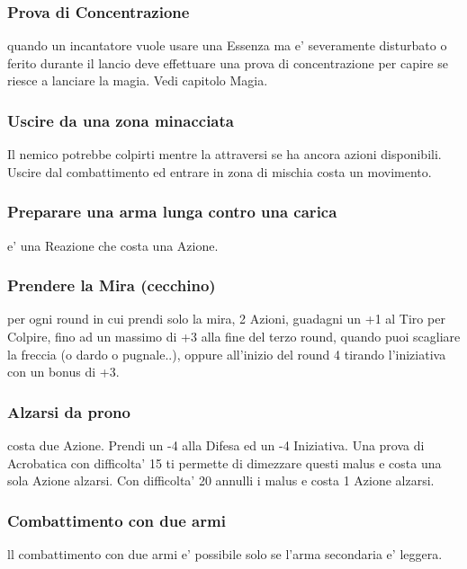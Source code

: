\documentclass[a4paper,11pt,twoside,openany]{dndbook}
\begin{document}
\subsubsection{Prova di Concentrazione} quando un incantatore vuole usare una Essenza ma e' severamente disturbato o ferito durante il lancio deve effettuare una prova di concentrazione per capire se riesce a lanciare la magia. Vedi capitolo Magia.

\subsubsection{Uscire da una zona minacciata} Il nemico potrebbe colpirti mentre la attraversi se ha ancora azioni disponibili. Uscire dal combattimento ed entrare in zona di mischia costa un movimento.

\subsubsection{Preparare una arma lunga contro una carica} e' una Reazione che costa una Azione.

\subsubsection{Prendere la Mira (cecchino)} per ogni round in cui prendi solo la mira, 2 Azioni, guadagni un +1 al Tiro per Colpire, fino ad un massimo di +3 alla fine del terzo round, quando puoi scagliare la freccia (o dardo o pugnale..), oppure all'inizio del round 4 tirando l'iniziativa con un bonus di +3.

\subsubsection{Alzarsi da prono} costa due Azione. Prendi un -4 alla Difesa ed un -4 Iniziativa. Una prova di Acrobatica con difficolta' 15 ti permette di dimezzare questi malus e costa una sola Azione alzarsi. Con difficolta' 20 annulli i malus e costa 1 Azione alzarsi.
	
\subsubsection{Combattimento con due armi} ll combattimento con due armi e' possibile solo se l'arma secondaria e' leggera.
\end{document}
